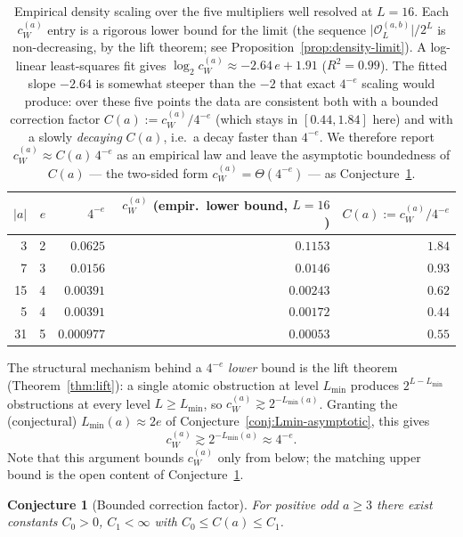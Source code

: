 \documentclass[11pt,reqno]{amsart}
\theoremstyle{plain}
\newtheorem{conjecture}[theorem]{Conjecture}
\theoremstyle{definition}
\theoremstyle{remark}
\newcommand{\Obs}{\mathcal{O}}
\newcommand{\cWa}{c_{W}^{(a)}}
\newcommand{\Obsab}{\Obs_{L}^{(a,b)}}
\begin{document}
\begin{table}[ht]
\centering
\begin{tabular}{rrrrr}
\toprule
$\lvert a \rvert$ & $e$ & $4^{-e}$ & $\cWa$ (empir.\ lower bound, $L = 16$) & $C(a) := \cWa / 4^{-e}$ \\
\midrule
3 & 2 & $0.0625$ & $0.1153$ & $1.84$ \\
7 & 3 & $0.0156$ & $0.0146$ & $0.93$ \\
15 & 4 & $0.00391$ & $0.00243$ & $0.62$ \\
5 & 4 & $0.00391$ & $0.00172$ & $0.44$ \\
31 & 5 & $0.000977$ & $0.00053$ & $0.55$ \\
\bottomrule
\end{tabular}
\caption{Empirical density scaling over the five multipliers well
resolved at $L = 16$. Each $\cWa$ entry is a rigorous lower bound for the
limit (the sequence $\lvert \Obsab \rvert / 2^L$ is non-decreasing, by the
lift theorem; see Proposition~\ref{prop:density-limit}). A log-linear least-squares fit
gives $\log_2 \cWa \approx -2.64\,e + 1.91$ ($R^2 = 0.99$). The fitted
slope $-2.64$ is somewhat steeper than the $-2$ that exact $4^{-e}$ scaling
would produce: over these five points the data are consistent both with a
bounded correction factor $C(a) := \cWa / 4^{-e}$ (which stays in $[0.44,
1.84]$ here) and with a slowly \emph{decaying} $C(a)$, i.e.\ a decay faster
than $4^{-e}$. We therefore report $\cWa \approx C(a)\,4^{-e}$ as an
empirical law and leave the asymptotic boundedness of $C(a)$ --- the
two-sided form $\cWa = \Theta(4^{-e})$ --- as Conjecture~\ref{conj:correction}.}
\label{tab:scaling}
\end{table}

The structural mechanism behind a $4^{-e}$ \emph{lower} bound is the lift
theorem (Theorem~\ref{thm:lift}): a single atomic obstruction at
level $L_{\min}$ produces $2^{L - L_{\min}}$ obstructions at every level
$L \ge L_{\min}$, so $\cWa \gtrsim 2^{-L_{\min}(a)}$. Granting the
(conjectural) $L_{\min}(a) \approx 2e$ of
Conjecture~\ref{conj:Lmin-asymptotic}, this gives
\[
\cWa \gtrsim 2^{-L_{\min}(a)} \approx 4^{-e}.
\]
Note that this argument bounds $\cWa$ only from below; the matching upper
bound is the open content of Conjecture~\ref{conj:correction}.

\begin{conjecture}[Bounded correction factor]\label{conj:correction}
For \emph{positive} odd $a \ge 3$ there exist constants $C_0 > 0$,
$C_1 < \infty$ with $C_0 \le C(a) \le C_1$.
\end{conjecture}
\end{document}
